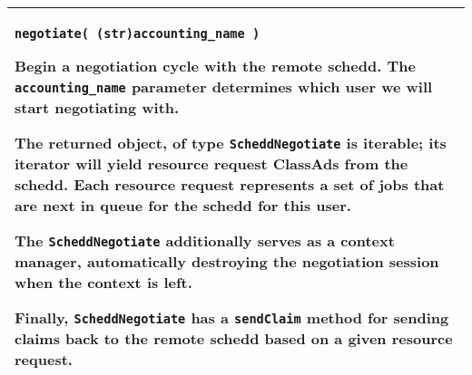 \begin{flushleft}
\begin{tabular}{|p{16cm}|}
\\ \hline
\texttt{negotiate( (str)accounting\_name )}

Begin a negotiation cycle with the remote schedd.  The \texttt{accounting\_name}
parameter determines which user we will start negotiating with.

The returned object, of type \texttt{ScheddNegotiate} is iterable; its iterator
will yield resource request ClassAds from the schedd.  Each resource request represents
a set of jobs that are next in queue for the schedd for this user.

The \texttt{ScheddNegotiate} additionally serves as a context manager, automatically
destroying the negotiation session when the context is left.

Finally, \texttt{ScheddNegotiate} has a \texttt{sendClaim} method for sending claims
back to the remote schedd based on a given resource request.

\\ \hline
\end{tabular}
\end{flushleft}

